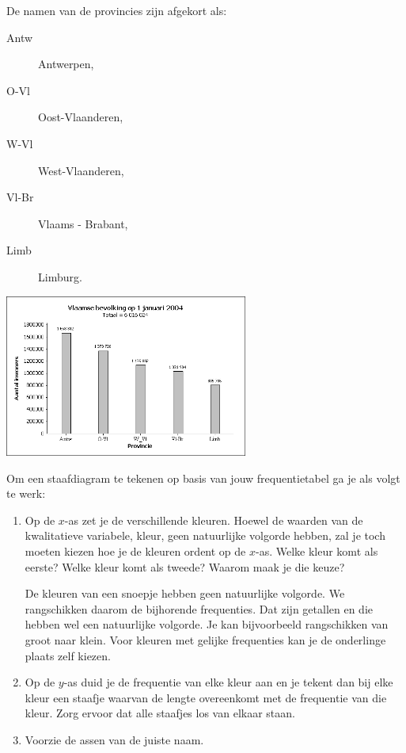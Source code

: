 \documentclass[11pt]{article}
\begin{document}
  
\begin{minipage}{0.5\textwidth}
De namen van de provincies zijn afgekort als:
  \begin{description}
    \item[Antw] Antwerpen,
    \item[O-Vl] Oost-Vlaanderen,
    \item[W-Vl] West-Vlaanderen,
    \item[Vl-Br] Vlaams - Brabant,
    \item[Limb] Limburg.
  \end{description}
\end{minipage}
\begin{minipage}{0.5\textwidth}
%  
  \includegraphics[width=8cm]{vlaamse_bevolking.png}
\end{minipage}

Om een staafdiagram te tekenen op basis van jouw frequentietabel ga je als volgt te werk:
\begin{enumerate}
  \item Op de $x$-as zet je de verschillende kleuren. Hoewel de waarden van de kwalitatieve variabele, kleur, geen natuurlijke volgorde hebben, zal je toch moeten kiezen hoe je de kleuren ordent op de $x$-as. Welke kleur komt als eerste? Welke kleur komt als tweede? Waarom maak je die keuze?

De kleuren van een snoepje hebben geen natuurlijke volgorde. We rangschikken daarom de
bijhorende frequenties. Dat zijn getallen en die hebben wel een natuurlijke volgorde. Je kan
bijvoorbeeld rangschikken van groot naar klein. Voor kleuren met gelijke frequenties kan je
de onderlinge plaats zelf kiezen.
\item Op de $y$-as duid je de frequentie van elke kleur aan en je tekent dan bij elke kleur een staafje
waarvan de lengte overeenkomt met de frequentie van die kleur. Zorg ervoor dat alle staafjes
los van elkaar staan.
\item Voorzie de assen van de juiste naam.
\end{enumerate}
\end{document}
